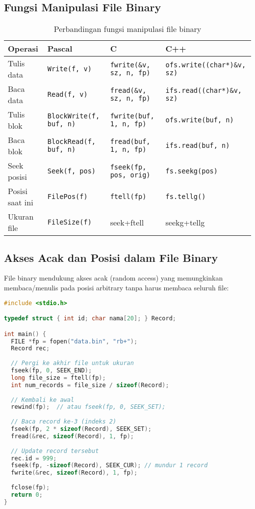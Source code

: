 \documentclass[../main.tex]{subfiles}
\begin{document}
\subsection{Fungsi Manipulasi File Binary}

\begin{table}[H]
\centering
\begin{tabular}{|l|l|l|l|}
\hline
\textbf{Operasi} & \textbf{Pascal} & \textbf{C} & \textbf{C++} \\ \hline
Tulis data & \texttt{Write(f, v)} & \texttt{fwrite(\&v, sz, n, fp)} & \texttt{ofs.write((char*)\&v, sz)} \\ \hline
Baca data & \texttt{Read(f, v)} & \texttt{fread(\&v, sz, n, fp)} & \texttt{ifs.read((char*)\&v, sz)} \\ \hline
Tulis blok & \texttt{BlockWrite(f, buf, n)} & \texttt{fwrite(buf, 1, n, fp)} & \texttt{ofs.write(buf, n)} \\ \hline
Baca blok & \texttt{BlockRead(f, buf, n)} & \texttt{fread(buf, 1, n, fp)} & \texttt{ifs.read(buf, n)} \\ \hline
Seek posisi & \texttt{Seek(f, pos)} & \texttt{fseek(fp, pos, orig)} & \texttt{fs.seekg(pos)} \\ \hline
Posisi saat ini & \texttt{FilePos(f)} & \texttt{ftell(fp)} & \texttt{fs.tellg()} \\ \hline
Ukuran file & \texttt{FileSize(f)} & seek+ftell & seekg+tellg \\ \hline
\end{tabular}
\caption{Perbandingan fungsi manipulasi file binary}
\end{table}

\subsection{Akses Acak dan Posisi dalam File Binary}

File binary mendukung akses acak (random access) yang memungkinkan membaca/menulis pada posisi arbitrary tanpa harus membaca seluruh file:

\begin{lstlisting}[language=C, caption={fseek/ftell untuk akses acak}]
#include <stdio.h>

typedef struct { int id; char nama[20]; } Record;

int main() {
  FILE *fp = fopen("data.bin", "rb+");
  Record rec;
  
  // Pergi ke akhir file untuk ukuran
  fseek(fp, 0, SEEK_END);
  long file_size = ftell(fp);
  int num_records = file_size / sizeof(Record);
  
  // Kembali ke awal
  rewind(fp);  // atau fseek(fp, 0, SEEK_SET);
  
  // Baca record ke-3 (indeks 2)
  fseek(fp, 2 * sizeof(Record), SEEK_SET);
  fread(&rec, sizeof(Record), 1, fp);
  
  // Update record tersebut
  rec.id = 999;
  fseek(fp, -sizeof(Record), SEEK_CUR); // mundur 1 record
  fwrite(&rec, sizeof(Record), 1, fp);
  
  fclose(fp);
  return 0;
}
\end{lstlisting}
\end{document}
